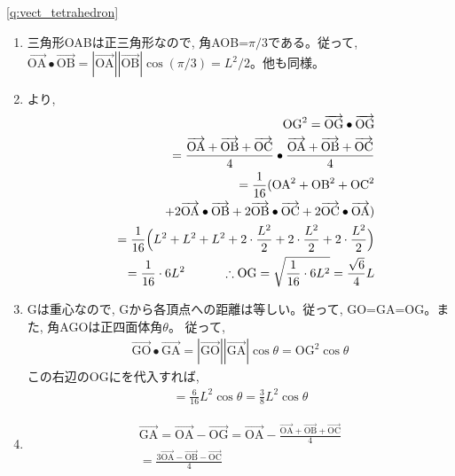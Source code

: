 \ref{q:vect_tetrahedron} 
\begin{enumerate}
\item 三角形OABは正三角形なので, 角AOB=$\pi/3$である。従って, 
$\overrightarrow{\text{OA}}\bullet\overrightarrow{\text{OB}}
=|\overrightarrow{\text{OA}}||\overrightarrow{\text{OB}}|\cos(\pi/3)
=L^2/2$。他も同様。
\item {}より, 
\begin{eqnarray*}
&&\text{OG}^2=\overrightarrow{\text{OG}}\bullet\overrightarrow{\text{OG}}\\
&&=\frac{\overrightarrow{\text{OA}}+\overrightarrow{\text{OB}}+\overrightarrow{\text{OC}}}{4}
\bullet\frac{\overrightarrow{\text{OA}}+\overrightarrow{\text{OB}}+\overrightarrow{\text{OC}}}{4}\\
&&=\frac{1}{16}(\text{OA}^2+\text{OB}^2+\text{OC}^2\\
&&\quad+2\overrightarrow{\text{OA}}\bullet\overrightarrow{\text{OB}}
+2\overrightarrow{\text{OB}}\bullet\overrightarrow{\text{OC}}
+2\overrightarrow{\text{OC}}\bullet\overrightarrow{\text{OA}})\\
&&=\frac{1}{16}\Bigl(L^2+L^2+L^2+2\cdot\frac{L^2}{2}+2\cdot\frac{L^2}{2}+2\cdot\frac{L^2}{2}\Bigr)\\
&&=\frac{1}{16}\cdot6L^2\quad\quad\quad
\therefore \text{OG}=\sqrt{\frac{1}{16}\cdot6L^2}=\frac{\sqrt{6}}{4}L\\
\end{eqnarray*}
\item Gは重心なので, Gから各頂点への距離は等しい。従って, GO=GA=OG。また, 角AGOは正四面体角$\theta$。
従って, 
\begin{eqnarray*}
\overrightarrow{\text{GO}}\bullet\overrightarrow{\text{GA}}=
|\overrightarrow{\text{GO}}||\overrightarrow{\text{GA}}|\cos\theta=\text{OG}^2\cos\theta
\end{eqnarray*}
この右辺のOGにを代入すれば, 
\begin{eqnarray*}
=\frac{6}{16}L^2\cos\theta=\frac{3}{8}L^2\cos\theta
\end{eqnarray*}
\item
\begin{eqnarray*}
\overrightarrow{\text{GA}}=\overrightarrow{\text{OA}}-\overrightarrow{\text{OG}}
=\overrightarrow{\text{OA}}-\frac{\overrightarrow{\text{OA}}+\overrightarrow{\text{OB}}+\overrightarrow{\text{OC}}}{4}\\
=\frac{3\overrightarrow{\text{OA}}-\overrightarrow{\text{OB}}-\overrightarrow{\text{OC}}}{4}

\end{eqnarray*}
\end{enumerate}
